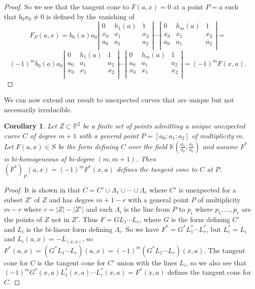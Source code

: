 \documentclass[12pt]{amsart}
\numberwithin{equation}{section}
\newtheorem{corollary}[theorem]{Corollary}
\theoremstyle{definition}
\newcommand{\PP}{ \ensuremath{\mathbb{P}}}
\newcommand{\KK}{ \ensuremath{\mathbb{K}}}
\begin{document}
\begin{proof}
So we see that the tangent cone to $F(a,x)=0$ at a point $P=a$ such that $b_0x_0\neq0$ is defined by the vanishing of
$$F_P(a,x)=b_0(a)a_0\left|\begin{array} {ccc}
0 & h_1(a)  & 1\\
x_0 & x_1 & x_2\\
a_0 & a_1 & a_2\\
\end{array}
\right|\cdots
\left|\begin{array} {ccc}
 0 & h_m(a)  & 1\\
x_0 & x_1 & x_2\\
a_0 & a_1 & a_2\\
\end{array}
\right|=$$
$$(-1)^mb_0(a)a_0\left|\begin{array} {ccc}
0 & h_1(a)  & 1\\
a_0 & a_1 & a_2\\
x_0 & x_1 & x_2\\
\end{array}
\right|\cdots
\left|\begin{array} {ccc}
 0 & h_m(a)  & 1\\
a_0 & a_1 & a_2\\
x_0 & x_1 & x_2\\
\end{array}
\right|=(-1)^mF(x,a).$$
\end{proof}

We can now extend our result to unexpected curves that are unique but not necessarily irreducible.

\begin{corollary}\label{BMSSDualityCor}
Let $Z\subset\PP^2$ be a finite set of points admitting a unique unexpected curve $C$ of degree $m+1$ with a general point $P=[a_0:a_1:a_2]$
of multiplicity $m$. Let $F(a,x)\in S$ be the form defining $C$ over the field $\KK(\frac{a_1}{a_0},\frac{a_2}{a_0})$ and assume
$F^*$ is bi-homogeneous of bi-degree $(m,m+1)$.
Then $(F^*)_P(a,x)=(-1)^mF^*(x,a)$ defines the tangent cone to $C$ at $P$.
\end{corollary}

\begin{proof}
It is shown in \cite{CHMN} that $C=C'\cup \Lambda_1\cup\cdots\cup \Lambda_r$ where $C'$ is unexpected for a subset
$Z'$ of $Z$ and has degree $m+1-r$ with a general point $P$ of multiplicity $m-r$ where $r=|Z|-|Z'|$
and each $\Lambda_i$ is the line from $P$ to $p_i$ where $p_1,\ldots, p_r$ are the points of $Z$ not in $Z'$.
Thus $F=GL_1\cdots L_r$, where $G$ is the form defining $C'$ and $L_i$ is the bi-linear form defining $\Lambda_i$. 
So we have $F^*=G^*L_1^*\cdots L_r^*$, but $L_i^*=L_i$ and $L_i(a,x)=-L_(x,a)$, so 
$F^*(a,x)=(G^*L_1\cdots L_r)(a,x)=(-1)^m(G^*L_1\cdots L_r)(x,a)$. The tangent cone for $C$ is the tangent cone for $C'$
union with the lines $L_i$, so we also see that $(-1)^mG^*(x,a)L_1^*(x,a)\cdots L_r^*(x,a)=F^*(x,a)$ defines the tangent cone
for $C$.
\end{proof}
\end{document}
